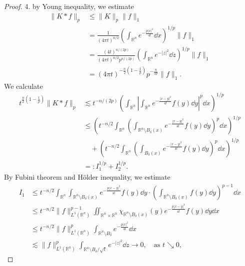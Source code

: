 \begin{proof}
	4. by Young inequality, we estimate
	\begin{align*}
		\|K*f\|_p &\leq \|K\|_p\|f\|_1\\
		&= \frac{1}{(4\pi t)^{n/2}}\left(\int_{\mathbb R^n}e^{-\frac{p|x|^2}{4t}}\dd x\right)^{1/p}\|f\|_1\\
		&= \frac{(4t)^{n/(2p)}}{(4\pi t)^{n/2}p^{n/(2p)}}\left(\int_{\mathbb R^n}e^{-|z|^2}\dd z\right)^{1/p}\|f\|_1\\
		&= (4\pi t)^{-\frac{n}2\left(1-\frac1p\right)}p^{-\frac{n}{2p}}\|f\|_1.
	\end{align*}
	We calculate
	\begin{align*}
		t^{\frac{n}{2}\left(1-\frac1p\right)}\|K*f\|_p 
		&\lesssim t^{-n/(2p)}\left(\int_{\mathbb R^n}\left|\int_{\mathbb R^n}e^{-\frac{|x-y|^2}{4t}}f(y)\dd y\right|^p\dd x\right)^{1/p}\\
		&\leq \left(t^{-n/2}\int_{\mathbb R^n}\left(\int_{\mathbb R^n\setminus B_\delta(x)}e^{-\frac{|x-y|^2}{4t}}f(y)\dd y\right)^p\dd x\right)^{1/p}\\
		&\quad + \left(t^{-n/2}\int_{\mathbb R^n}\left(\int_{B_\delta(x)}e^{-\frac{|x-y|^2}{4t}}f(y)\dd y\right)^p\dd x\right)^{1/p}\\
		&=: I_1^{1/p} + I_2^{1/p}.
	\end{align*}
	By Fubini theorem and H\"older inequality, we estimate
	\begin{align*}
		I_1
		&\leq t^{-n/2} \int_{\mathbb R^n}\int_{\mathbb R^n\setminus B_\delta(x)}e^{-\frac{p|x-y|^2}{4t}}f(y)\dd y
		\cdot \left(\int_{\mathbb R^n\setminus B_\delta(x)}f(y)\dd y\right)^{p-1}\dd x\\
		&\leq t^{-n/2}\|f\|^{p-1}_{L^1(\mathbb R^n)}\iint_{\mathbb R^n\times\mathbb R^n}
		\chi_{\mathbb R^n\setminus B_\delta(x)}(y)	e^{-\frac{p|x-y|^2}{4t}}f(y)\dd y\dd x\\
		&\leq t^{-n/2}\|f\|_{L^1(\mathbb R^n)}^{p}\int_{\mathbb R^n\setminus B_\delta}e^{-\frac{p|x|^2}{4t}}\dd x\\
		&\lesssim \|f\|_{L^1(\mathbb R^n)}^{p}\int_{\mathbb R^n\setminus B_\delta/\sqrt t}e^{-|z|^2}\dd z
		\to 0,\quad\text{as }t\searrow0,
	\end{align*}

\end{proof}
